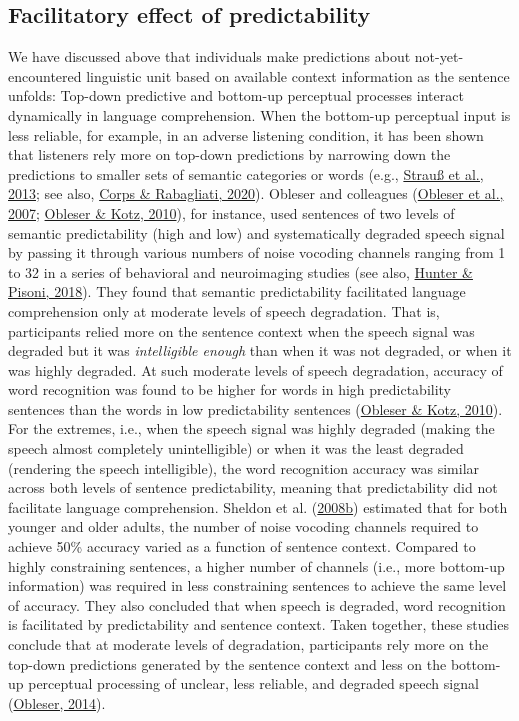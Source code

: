 \documentclass[a4paper, nobind]{templates/ociamthesis}
\begin{document}
\hypertarget{background-facilitatory-effect}{%
\subsection{Facilitatory effect of predictability}\label{background-facilitatory-effect}}

We have discussed above that individuals make predictions about not-yet-encountered linguistic unit based on available context information as the sentence unfolds:
Top-down predictive and bottom-up perceptual processes interact dynamically in language comprehension.
When the bottom-up perceptual input is less reliable, for example, in an adverse listening condition, it has been shown that listeners rely more on top-down predictions by narrowing down the predictions to smaller sets of semantic categories or words (e.g., \protect\hyperlink{ref-Strauss2013}{Strauß et al., 2013}; see also, \protect\hyperlink{ref-Corps2020}{Corps \& Rabagliati, 2020}).
Obleser and colleagues (\protect\hyperlink{ref-Obleser2007}{Obleser et al., 2007}; \protect\hyperlink{ref-Obleser2010}{Obleser \& Kotz, 2010}), for instance, used sentences of two levels of semantic predictability (high and low) and systematically degraded speech signal by passing it through various numbers of noise vocoding channels ranging from 1 to 32 in a series of behavioral and neuroimaging studies (see also, \protect\hyperlink{ref-Hunter2018}{Hunter \& Pisoni, 2018}).
They found that semantic predictability facilitated language comprehension only at moderate levels of speech degradation.
That is, participants relied more on the sentence context when the speech signal was degraded but it was \emph{intelligible enough} than when it was not degraded, or when it was highly degraded.
At such moderate levels of speech degradation, accuracy of word recognition was found to be higher for words in high predictability sentences than the words in low predictability sentences (\protect\hyperlink{ref-Obleser2010}{Obleser \& Kotz, 2010}).
For the extremes, i.e., when the speech signal was highly degraded (making the speech almost completely unintelligible) or when it was the least degraded (rendering the speech intelligible),
the word recognition accuracy was similar across both levels of sentence predictability, meaning that predictability did not facilitate language comprehension.
Sheldon et al. (\protect\hyperlink{ref-Sheldon2008b}{2008b}) estimated that for both younger and older adults, the number of noise vocoding channels required to achieve 50\% accuracy varied as a function of sentence context.
Compared to highly constraining sentences, a higher number of channels (i.e., more bottom-up information) was required in less constraining sentences to achieve the same level of accuracy.
They also concluded that when speech is degraded, word recognition is facilitated by predictability and sentence context.
Taken together, these studies conclude that at moderate levels of degradation, participants rely more on the top-down predictions generated by the sentence context and less on the bottom-up perceptual processing of unclear, less reliable, and degraded speech signal (\protect\hyperlink{ref-Obleser2014}{Obleser, 2014}).
\end{document}
